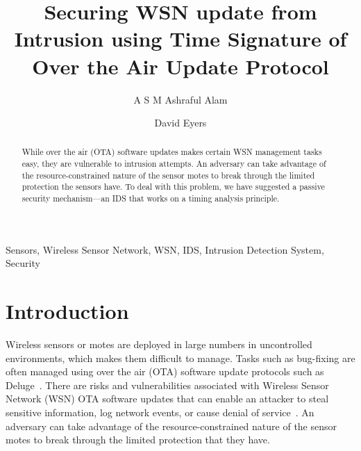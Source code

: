 \documentclass{CRPITStyle}
\renewcommand{\cite}{\citep}
\begin{document}
\title{Securing WSN update from Intrusion using Time Signature of Over the Air Update Protocol}
\author{A S M Ashraful Alam  \and  David Eyers 	  }

\maketitle

\newcommand\conferencenameandplace{Twenty-Ninth Australasian Computer Science Conference (ACSC2006), Hobart, Australia}
\newcommand\volumenumber{48}
\newcommand\conferenceyear{2006}
\newcommand\editorname{Vladimir Estivill-Castro and Gillian Dobbie}
\toappearstandard 

\begin{abstract}
While over the air (OTA) software updates makes certain WSN management tasks easy, they are vulnerable to intrusion attempts.
An adversary can take advantage of the resource-constrained nature of the sensor motes to break through the limited protection the sensors have.
To deal with this problem, we have suggested a passive security mechanism---an IDS that works on a timing analysis principle.  
\end{abstract}
\vspace{.1in}

 Sensors, Wireless Sensor Network, WSN, IDS, Intrusion Detection System, Security

\section{Introduction}
\label{sec:intro}

Wireless sensors or motes are deployed in large numbers in uncontrolled environments, which makes them difficult to manage.
Tasks such as bug-fixing are often managed using over the air (OTA) software update protocols such as Deluge~\cite{1031506}.
There are risks and vulnerabilities associated with Wireless Sensor Network (WSN) OTA software updates that can enable an attacker to steal sensitive information, log network events, or cause denial of service~\cite{1127826}.
An adversary can take advantage of the resource-constrained nature of the sensor motes to break through the limited protection that they have.
\end{document}
